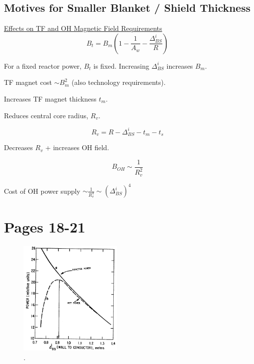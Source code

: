 \documentclass[11pt]{report} %
\begin{document}
\subsection{Motives for Smaller Blanket / Shield Thickness}
\underline{Effects on TF and OH Magnetic Field Requirements}
\begin{equation}
  B_t = B_m \left( 1 - \frac{1}{A_w} - \frac{\Delta_{BS}^i}{R} \right)
\end{equation}

For a fixed reactor power, $B_t$ is fixed.
Increasing $\Delta_{BS}^i$ increases $B_m$.

TF magnet cost $\sim B_m^2$ (also technology requirements).

Increases TF magnet thickness $t_m$.

Reduces central core radius, $R_v$.

\begin{equation}
  R_v = R - \Delta_{BS}^i - t_m - t_s
\end{equation}

Decreases $R_v$ + increases OH field.

\begin{equation}
  B_{OH} \sim \frac{1}{R_v^2}
\end{equation}

Cost of OH power supply $\sim \frac{1}{R_v^4} \sim (\Delta_{BS}^i)^4 $

\section{Pages 18-21}

\begin{figure}[H]
  \centering
  \includegraphics[width=0.45\textwidth]{figs/power.png}
  \caption{.}
\end{figure}
\end{document}

